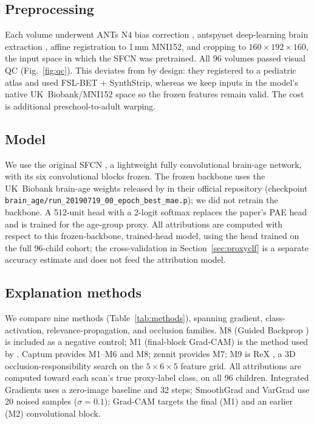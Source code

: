 \documentclass[11pt]{article}
\begin{document}
\subsection{Preprocessing}
Each volume underwent ANTs \citep{avants2011} N4 bias correction \citep{tustison2010},
antspynet deep-learning brain extraction \citep{tustison2021},
affine registration to 1\,mm MNI152, and cropping to $160\times192\times160$, the input
space in which the SFCN was pretrained. All 96 volumes passed visual QC
(Fig.~\ref{fig:qc}). This deviates from \citet{das2024} by design: they registered to a
pediatric atlas and used FSL-BET + SynthStrip, whereas we keep inputs in the model's native
UK~Biobank/MNI152 space so the frozen features remain valid. The cost is additional
preschool-to-adult warping.

\subsection{Model}
We use the original SFCN \citep{peng2021}, a lightweight fully convolutional brain-age
network, with its six convolutional blocks frozen. The frozen backbone uses the UK~Biobank
brain-age weights released by \citet{peng2021} in their official repository
\citep{sfcnweights} (checkpoint \texttt{brain\_age/run\_20190719\_00\_epoch\_best\_mae.p}); we
did not retrain the backbone. A 512-unit head with a 2-logit softmax
replaces the paper's PAE head and is trained for the age-group proxy. All attributions are
computed with respect to this frozen-backbone, trained-head model, using the head trained on
the full 96-child cohort; the cross-validation in Section~\ref{sec:proxyclf} is a separate
accuracy estimate and does not feed the attribution model.

\subsection{Explanation methods}
We compare nine methods (Table~\ref{tab:methods}), spanning gradient, class-activation,
relevance-propagation, and occlusion families. M8 (Guided Backprop \citep{springenberg2015})
is included as a negative control; M1 (final-block Grad-CAM) is the method used by
\citet{das2024}. Captum \citep{kokhlikyan2020} provides M1--M6 and M8; zennit
\citep{anders2021} provides M7; M9 is ReX \citep{chockler2024rex}, a 3D
occlusion-responsibility search on the $5\times6\times5$ feature grid. All attributions are
computed toward each scan's true proxy-label class, on all 96 children. Integrated Gradients
uses a zero-image baseline and 32 steps; SmoothGrad and VarGrad use 20 noised samples
($\sigma=0.1$); Grad-CAM targets the final (M1) and an earlier (M2) convolutional block.
\end{document}
